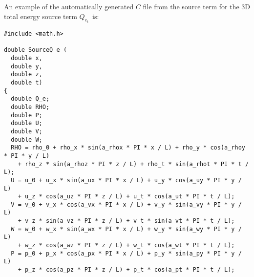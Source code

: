 \documentclass[10pt]{article}
\begin{document}
An example of the automatically generated $C$ file from the source term for the 3D total energy source term $Q_{e_t}$~is:

\begin{small}
\begin{verbatim}
#include <math.h>

double SourceQ_e (
  double x,
  double y,
  double z,
  double t)
{
  double Q_e;
  double RHO;
  double P;
  double U;
  double V;
  double W;
  RHO = rho_0 + rho_x * sin(a_rhox * PI * x / L) + rho_y * cos(a_rhoy * PI * y / L)
    + rho_z * sin(a_rhoz * PI * z / L) + rho_t * sin(a_rhot * PI * t / L);
  U = u_0 + u_x * sin(a_ux * PI * x / L) + u_y * cos(a_uy * PI * y / L)
    + u_z * cos(a_uz * PI * z / L) + u_t * cos(a_ut * PI * t / L);
  V = v_0 + v_x * cos(a_vx * PI * x / L) + v_y * sin(a_vy * PI * y / L)
    + v_z * sin(a_vz * PI * z / L) + v_t * sin(a_vt * PI * t / L);
  W = w_0 + w_x * sin(a_wx * PI * x / L) + w_y * sin(a_wy * PI * y / L)
    + w_z * cos(a_wz * PI * z / L) + w_t * cos(a_wt * PI * t / L);
  P = p_0 + p_x * cos(a_px * PI * x / L) + p_y * sin(a_py * PI * y / L)
    + p_z * cos(a_pz * PI * z / L) + p_t * cos(a_pt * PI * t / L);


\end{verbatim}
\end{small}
\end{document}
